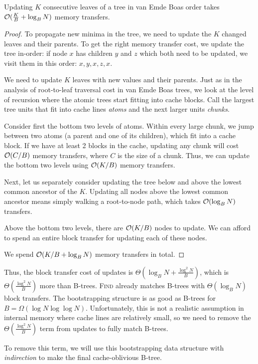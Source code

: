 \begin{theorem}
Updating $K$ consecutive leaves of a tree in van Emde Boas order takes
$\mathcal{O}(\frac{K}{B}+\log_B N)$ memory transfers.
\end{theorem}
\begin{proof}
To propagate new minima in the tree, we need to update the $K$ changed leaves
and their parents. To get the right memory transfer cost, we update the tree
in-order: if node $x$ has children $y$ and $z$ which both need to be updated,
we visit them in this order: $x,y,x,z,x$.

We need to update $K$ leaves with new values and their parents.
Just as in the analysis of root-to-leaf traversal cost in van Emde Boas trees,
we look at the level of recursion where the atomic trees start fitting into
cache blocks.
Call the largest tree units that fit into cache lines \emph{atoms} and the next
larger units \emph{chunks}.

Consider first the bottom two levels of atoms. Within every large chunk,
we jump between two atoms (a parent and one of its children), which fit into
a cache block. If we have at least 2 blocks in the cache, updating any chunk
will cost $\mathcal{O}(C/B)$ memory transfers, where $C$ is the size of a chunk.
Thus, we can update the bottom two levels using $\mathcal{O}(K/B)$ memory transfers.

Next, let us separately consider updating the tree below and above the lowest
common ancestor of the $K$. Updating all nodes above the lowest common ancestor
means simply walking a root-to-node path, which takes $\mathcal{O}(\log_B N)$ transfers.

Above the bottom two levels, there are $\mathcal{O}(K/B)$ nodes to update. We can afford
to spend an entire block transfer for updating each of these nodes.

We spend $\mathcal{O}(K/B + \log_B N)$ memory transfers in total.
\end{proof}

Thus, the block transfer cost of updates is $\Theta(\log_B N+\frac{\log^2
N}{B})$, which is $\Theta(\frac{\log^2 N}{B})$ more than B-trees.
\textsc{Find} already matches B-trees with $\Theta(\log_B N)$ block transfers.
The bootstrapping structure is as good as B-trees for
$B=\Omega(\log N\log\log N)$.  Unfortunately, this is not a realistic
assumption in internal memory where cache lines are relatively small, so we
need to remove the $\Theta(\frac{\log^2 N}{B})$ term from updates to fully
match B-trees.

To remove this term, we will use this bootstrapping data structure with
\emph{indirection} to make the final cache-oblivious B-tree.

